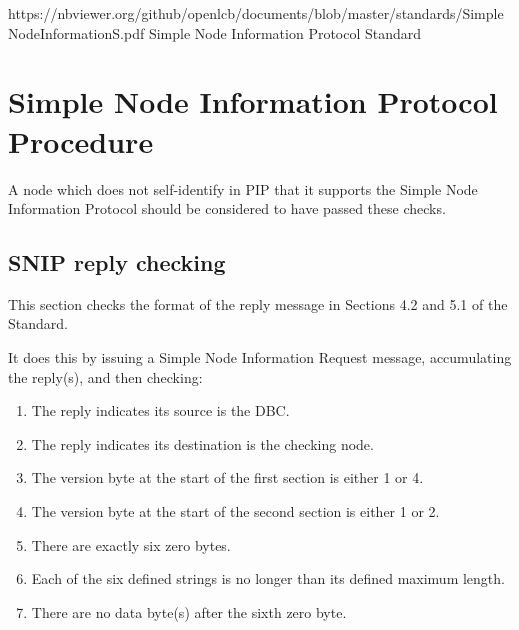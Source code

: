 



\maketitle
\thispagestyle{firststyle}

\introductionCaveats
    {https://nbviewer.org/github/openlcb/documents/blob/master/standards/SimpleNodeInformationS.pdf}
    {Simple Node Information Protocol Standard}

\section{Simple Node Information Protocol Procedure}


A node which does not self-identify in PIP that it supports
the Simple Node Information Protocol should be considered to have passed these checks.
\pipsetFootnote

\subsection{SNIP reply checking}

This section checks the format of the reply message in Sections 4.2 and 5.1 of the Standard.

It does this by issuing a Simple Node Information Request message, 
accumulating the reply(s), and then checking:
    \begin{enumerate}
    \item The reply indicates its source is the DBC.
    \item The reply indicates its destination is the checking node.
    \item The version byte at the start of the first section is either 1 or 4.
    \item The version byte at the start of the second section is either 1 or 2.
    \item There are exactly six zero bytes.
    \item Each of the six defined strings is no longer than its defined maximum length.
    \item There are no data byte(s) after the sixth zero byte.
    \end{enumerate}

  
